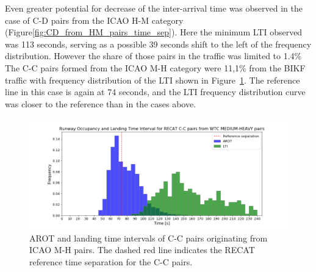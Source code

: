 Even greater potential for decrease of the inter-arrival time was observed in the case of C-D pairs from the ICAO H-M category (Figure\ref{fig:CD_from_HM_pairs_time_sep}). Here the minimum LTI observed was 113 seconds, serving as a possible 39 seconds shift to the left of the frequency distribution. However the share of those pairs in the traffic was limited to 1.4\%\\

The C-C pairs formed from the ICAO M-H category were 11,1\% from the BIKF traffic with frequency distribution of the LTI shown in Figure~\ref{fig:CC_from_MH_pairs_time_sep}. The reference line in this case is again at 74 seconds, and the LTI frequency distribution curve was closer to the reference than in the cases above.
\begin{figure}[h]
    \centering
    \includegraphics[width=1\textwidth]{graphics/fig_CC_from_MH_pairs_time_sep.png}
    \caption[AROT and LTI of C-C pairs originating from ICAO M-H pairs]{AROT and landing time intervals of C-C pairs originating from ICAO M-H pairs. The dashed red line indicates the RECAT reference time separation for the C-C pairs.}
    \label{fig:CC_from_MH_pairs_time_sep}
\end{figure}

